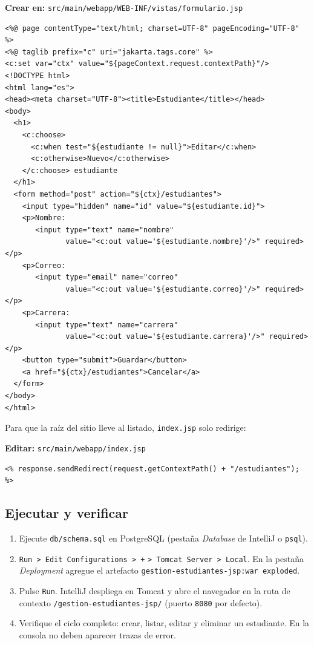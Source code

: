 \documentclass[11pt,a4paper,openany]{book}
\begin{document}
{\small\textbf{Crear en:} \texttt{src/main/webapp/WEB-INF/vistas/formulario.jsp}}
\begin{lstlisting}[style=html,caption={formulario.jsp (alta y edicion)},label={lst:jsp-form}]
<%@ page contentType="text/html; charset=UTF-8" pageEncoding="UTF-8" %>
<%@ taglib prefix="c" uri="jakarta.tags.core" %>
<c:set var="ctx" value="${pageContext.request.contextPath}"/>
<!DOCTYPE html>
<html lang="es">
<head><meta charset="UTF-8"><title>Estudiante</title></head>
<body>
  <h1>
    <c:choose>
      <c:when test="${estudiante != null}">Editar</c:when>
      <c:otherwise>Nuevo</c:otherwise>
    </c:choose> estudiante
  </h1>
  <form method="post" action="${ctx}/estudiantes">
    <input type="hidden" name="id" value="${estudiante.id}">
    <p>Nombre:
       <input type="text" name="nombre"
              value="<c:out value='${estudiante.nombre}'/>" required></p>
    <p>Correo:
       <input type="email" name="correo"
              value="<c:out value='${estudiante.correo}'/>" required></p>
    <p>Carrera:
       <input type="text" name="carrera"
              value="<c:out value='${estudiante.carrera}'/>" required></p>
    <button type="submit">Guardar</button>
    <a href="${ctx}/estudiantes">Cancelar</a>
  </form>
</body>
</html>
\end{lstlisting}

Para que la raíz del sitio lleve al listado, \texttt{index.jsp} solo
redirige:

{\small\textbf{Editar:} \texttt{src/main/webapp/index.jsp}}
\begin{lstlisting}[style=html,caption={index.jsp (redireccion al servlet)},label={lst:jsp-index}]
<% response.sendRedirect(request.getContextPath() + "/estudiantes"); %>
\end{lstlisting}

\subsection{Ejecutar y verificar}
\label{ap:crud:jsp:run}

\begin{enumerate}
\item Ejecute \texttt{db/schema.sql} en PostgreSQL (pestaña
\emph{Database} de IntelliJ o \texttt{psql}).
\item \texttt{Run > Edit Configurations > +} \texttt{> Tomcat Server >
Local}. En la pestaña \emph{Deployment} agregue el artefacto
\texttt{gestion-estudiantes-jsp:war exploded}.
\item Pulse \texttt{Run}. IntelliJ despliega en Tomcat y abre el
navegador en la ruta de contexto \texttt{/gestion-estudiantes-jsp/}
(puerto \texttt{8080} por defecto).
\item Verifique el ciclo completo: crear, listar, editar y eliminar un
estudiante. En la consola no deben aparecer trazas de error.
\end{enumerate}
\end{document}
